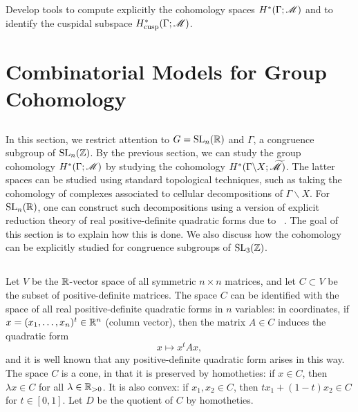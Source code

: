 \begin{problem}
Develop tools to compute explicitly the cohomology spaces $H^{*}
(\Gamma ; \mathscr M)$ and to identify the cuspidal
subspace $H^{*}_{\text{cusp}} (\Gamma ; {\mathscr M})$. 
\end{problem}


\section{Combinatorial Models for Group Cohomolo\-gy}\label{comb.models}
%
\subsection{}
%
In this section, we restrict attention to $G=\operatorname{SL}_{n} (\mathbb{R})$ and
$\Gamma$, a congruence subgroup of $\operatorname{SL}_{n} (\mathbb{Z})$.  By the previous
section, we can study the group cohomology $H^{*} (\Gamma ; \mathscr M)$ by
studying the cohomology $H^{*} (\Gamma \backslash X;
\widetilde{\mathscr M})$.  The latter spaces can be studied using standard
topological techniques, such as taking the cohomology of complexes
associated to cellular decompositions of $\Gamma \backslash X$.  For
$\operatorname{SL}_{n} (\mathbb{R} ) $, one can construct such decompositions using a
version of explicit reduction theory of real positive-definite
quadratic forms due to \Vor\ \cite{vor1}.  The goal of this section is
to explain how this is done.  We also discuss how the cohomology can
be explicitly studied for congruence subgroups of $\operatorname{SL}_{3} (\mathbb{Z})$.

\subsection{}\label{vcd.section}
%
Let $V$ be the $\mathbb{R} $-vector space of all symmetric $n\times n$
matrices, and let $C\subset V$ be the subset of positive-definite
matrices.  The space $C$ can be identified with the space of all real
positive-definite quadratic forms in $n$ variables: in coordinates, if $x=
(x_{1},\dotsc ,x_{n})^{t}\in \mathbb{R}^{n}$ (column vector), then the matrix
$A\in C$ induces the 
quadratic form  
\[
x \longmapsto x^{t}Ax,
\]
and it is well known that any positive-definite quadratic form arises
in this way.  The space $C$ is a cone, in that it is preserved by
homotheties: if $x\in C$, then $\lambda x\in C$ for all $\lambda \in
\mathbb{R}_{>0}$.  It is also convex: if $x_{1}, x_{2}\in C$, then $tx_{1}+
(1-t)x_{2}\in C$ for $t\in [0,1]$.  Let $D$ be the quotient of $C$ by
homotheties.

